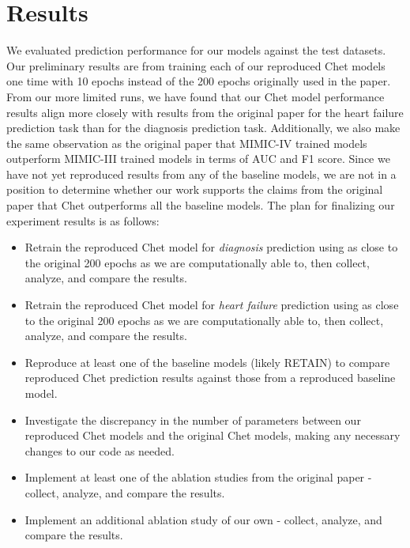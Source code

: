 \documentclass[11pt,a4paper,fleqn]{article}
\begin{document}
\section{Results}
We evaluated prediction performance for our models against the test datasets.
Our preliminary results are from training each of our reproduced Chet models one
time with 10 epochs instead of the 200 epochs originally used in the paper. From
our more limited runs, we have found that our Chet model performance results
align more closely with results from the original paper for the heart failure
prediction task than for the diagnosis prediction task. Additionally, we also
make the same observation as the original paper that MIMIC-IV trained models
outperform MIMIC-III trained models in terms of AUC and F1 score. Since we have
not yet reproduced results from any of the baseline models, we are not in a
position to determine whether our work supports the claims from the original
paper that Chet outperforms all the baseline models. The plan for finalizing our
experiment results is as follows: 
\begin{itemize}
    \item Retrain the reproduced Chet model for \emph{diagnosis} prediction
    using as close to the original 200 epochs as we are computationally able to,
    then collect, analyze, and compare the results.
    \item Retrain the reproduced Chet model for \emph{heart failure} prediction
    using as close to the original 200 epochs as we are computationally able to,
    then collect, analyze, and compare the results.
    \item Reproduce at least one of the baseline models (likely RETAIN) to
    compare reproduced Chet prediction results against those from a reproduced
    baseline model.
    \item Investigate the discrepancy in the number of parameters between our
    reproduced Chet models and the original Chet models, making any necessary
    changes to our code as needed.
    \item Implement at least one of the ablation studies from the original paper
    - collect, analyze, and compare the results.
    \item Implement an additional ablation study of our own - collect, analyze,
    and compare the results.
\end{itemize}
\end{document}

